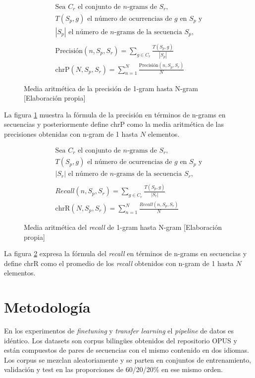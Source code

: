 \begin{figure}[H]
    \begin{align*}
        \text{Sea }C_{r}\text{ el conjunto de }n\text{-grams de }S_{r}\text{,}\\
        T(S_{p}, g)\text{ el número de ocurrencias de }g\text{ en }S_{p}\text{ y}\\
        |S_{p}|\text{ el número de }n\text{-grams de la secuencia }S_{p}\text{,}\\ \\
        \text{Precisión}(n,S_{p},S_{r})=\sum_{g\in{C_{r}}}{\frac{ T(S_{p},g) }{ |S_{p}| }}\\
        \text{chrP}(N,S_{p},S_{r})=\sum_{n=1}^{N}\frac{\text{Precisión}(n,S_{p},S_{r})}{N}
    \end{align*}
    \caption{Media aritmética de la precisión de 1-gram hasta N-gram [Elaboración propia]}\label{chrfprecisionformula}
\end{figure}

La figura \ref{chrfprecisionformula} muestra la fórmula de la precisión en términos de n-grams en secuencias y posteriormente define chrP como la media aritmética de las precisiones obtenidas con n-gram de 1 hasta $N$ elementos.

\begin{figure}[H]
    \begin{align*}
        \text{Sea }C_{r}\text{ el conjunto de }n\text{-grams de }S_{r}\text{,}\\
        T(S_{p}, g)\text{ el número de ocurrencias de }g\text{ en }S_{p}\text{ y}\\
        |S_{r}|\text{ el número de }n\text{-grams de la secuencia }S_{r}\text{,}\\ \\
        \textit{Recall}(n,S_{p},S_{r})=\sum_{g\in{C_{r}}}{\frac{ T(S_{p},g) }{ |S_{r}| }}\\
        \text{chrR}(N,S_{p},S_{r})=\sum_{n=1}^{N}\frac{\textit{Recall}(n,S_{p},S_{r})}{N}
    \end{align*}
    \caption{Media aritmética del \textit{recall} de 1-gram hasta N-gram [Elaboración propia]}\label{chrfrecallformula}
\end{figure}

La figura \ref{chrfrecallformula} expresa la fórmula del \textit{recall} en términos de n-grams en secuencias y define chrR como el promedio de los \textit{recall} obtenidos con n-gram de 1 hasta $N$ elementos.

\section{Metodología}\label{datapipeline}
En los experimentos de \textit{finetuning} y \textit{transfer learning} el \textit{pipeline} de datos es idéntico. Los datasets son corpus biling{\"u}es obtenidos del repositorio OPUS \cite{CORPUS} y están compuestos de pares de secuencias con el mismo contenido en dos idiomas. Los corpus se mezclan aleatoriamente y se parten en conjuntos de entrenamiento, validación y test en las proporciones de 60/20/20\% en ese mismo orden.

